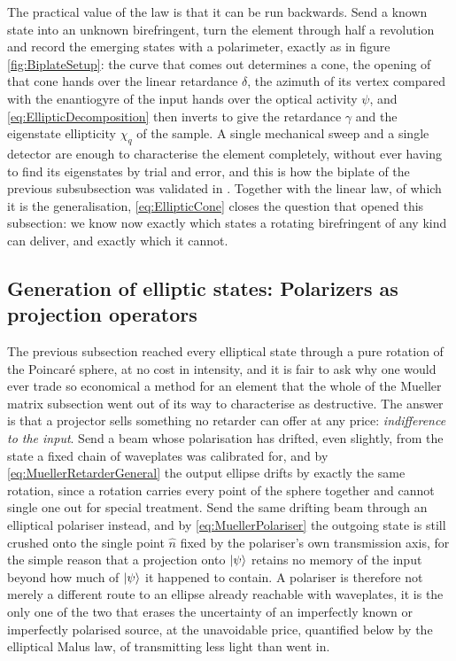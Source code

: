             The practical value of the law is that it can be run backwards. Send a known state into an unknown birefringent, turn the element through half a revolution and record the emerging states with a polarimeter, exactly as in figure \ref{fig:BiplateSetup}: the curve that comes out determines a cone, the opening of that cone hands over the linear retardance $\delta$, the azimuth of its vertex compared with the enantiogyre of the input hands over the optical activity $\psi$, and \ref{eq:EllipticDecomposition} then inverts to give the retardance $\gamma$ and the eigenstate ellipticity $\chi_q$ of the sample. A single mechanical sweep and a single detector are enough to characterise the element completely, without ever having to find its eigenstates by trial and error, and this is how the biplate of the previous subsubsection was validated in \citep{pabon2023tunable}. Together with the linear law, of which it is the generalisation, \ref{eq:EllipticCone} closes the question that opened this subsection: we know now exactly which states a rotating birefringent of any kind can deliver, and exactly which it cannot.

    \subsection{Generation of elliptic states: Polarizers as projection operators  }

        The previous subsection reached every elliptical state through a pure rotation of the Poincaré sphere, at no cost in intensity, and it is fair to ask why one would ever trade so economical a method for an element that the whole of the Mueller matrix subsection went out of its way to characterise as destructive. The answer is that a projector sells something no retarder can offer at any price: \emph{indifference to the input}. Send a beam whose polarisation has drifted, even slightly, from the state a fixed chain of waveplates was calibrated for, and by \ref{eq:MuellerRetarderGeneral} the output ellipse drifts by exactly the same rotation, since a rotation carries every point of the sphere together and cannot single one out for special treatment. Send the same drifting beam through an elliptical polariser instead, and by \ref{eq:MuellerPolariser} the outgoing state is still crushed onto the single point $\hat n$ fixed by the polariser's own transmission axis, for the simple reason that a projection onto $\ket{\psi}$ retains no memory of the input beyond how much of $\ket{\psi}$ it happened to contain. A polariser is therefore not merely a different route to an ellipse already reachable with waveplates, it is the only one of the two that erases the uncertainty of an imperfectly known or imperfectly polarised source, at the unavoidable price, quantified below by the elliptical Malus law, of transmitting less light than went in.

